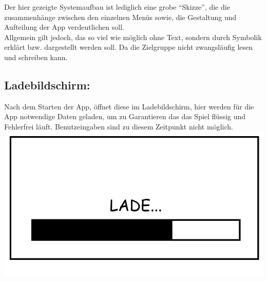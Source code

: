 \documentclass{scrartcl}
\begin{document}
Der hier gezeigte Systemaufbau ist lediglich eine grobe \enquote{Skizze},
die die zusammenhänge zwischen den einzelnen Menüs sowie, 
die Gestaltung und Aufteilung der App verdeutlichen soll.\\
Allgemein gilt jedoch, das so viel wie möglich ohne Text, sondern durch Symbolik erklärt bzw. dargestellt werden soll. Da die Zielgruppe nicht zwangsläufig lesen und schreiben kann.\\

\begin{enumerate}
	\begin{minipage}{1\textwidth}
		\item \subsection*{Ladebildschirm:} \label{appaufbau:Ladebildschirm}
		Nach dem Starten der App, öffnet diese im Ladebildschirm, hier werden für die App notwendige Daten geladen, um zu Garantieren das das Spiel flüssig und Fehlerfrei läuft. Benutzeingaben sind zu diesem Zeitpunkt nicht möglich.\\
		\includegraphics[width=\textwidth]{assets/LoadScreen}
	\end{minipage}
	
	\begin{minipage}{1\textwidth}
		

\end{minipage}
\end{enumerate}
\end{document}
